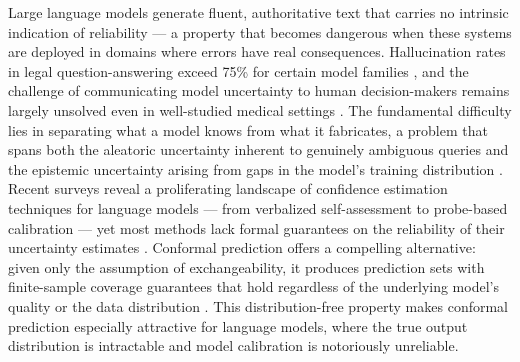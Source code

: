 \documentclass{article}
\begin{document}
Large language models generate fluent, authoritative text that carries no intrinsic indication of reliability --- a property that becomes dangerous when these systems are deployed in domains where errors have real consequences. Hallucination rates in legal question-answering exceed 75\% for certain model families \cite{dahl2024large}, and the challenge of communicating model uncertainty to human decision-makers remains largely unsolved even in well-studied medical settings \cite{kompa2021second}. The fundamental difficulty lies in separating what a model knows from what it fabricates, a problem that spans both the aleatoric uncertainty inherent to genuinely ambiguous queries and the epistemic uncertainty arising from gaps in the model's training distribution \cite{hullermeier2021aleatoric}. Recent surveys reveal a proliferating landscape of confidence estimation techniques for language models --- from verbalized self-assessment to probe-based calibration \cite{geng2024survey} --- yet most methods lack formal guarantees on the reliability of their uncertainty estimates \cite{shorinwa2024survey}. Conformal prediction offers a compelling alternative: given only the assumption of exchangeability, it produces prediction sets with finite-sample coverage guarantees that hold regardless of the underlying model's quality or the data distribution \cite{angelopoulos2021gentle}. This distribution-free property makes conformal prediction especially attractive for language models, where the true output distribution is intractable and model calibration is notoriously unreliable.
\end{document}
